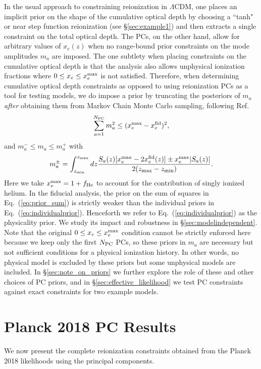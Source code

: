 \documentclass[prd,twocolumn,amsmath,amssymb,floatfix,superscriptaddress,nofootinbib]{revtex4-1}
\begin{document}
In the usual approach to constraining reionization in $\Lambda$CDM, one places an implicit prior on the shape of the cumulative optical depth by choosing a ``tanh" or near step function reionization (see \S \ref{sec:example1}) and then extracts a single constraint on the total optical depth.
The PCs, on the other hand, allow for arbitrary values of $x_e(z)$ when no range-bound prior constraints on the mode amplitudes $m_a$ are imposed. The one subtlety when placing constraints on the cumulative optical depth is that the analysis also allows
unphysical ionization fractions where $0 \le x_e \le x_e^{\rm max}$  is not satisfied.
Therefore, when determining cumulative optical depth constraints as opposed to using reionization PCs as a tool for testing models,
 we do impose a  prior
 by truncating the posteriors of $m_a$
 {\it after} obtaining them from Markov Chain Monte Carlo sampling, following Ref.~\cite{Mortonson:2008rx}
%
\begin{equation}
\sum_{a=1}^{N_{\rm PC}} m_a^2 \le (x_e^{\rm max}-x_e^{\rm fid})^2,
\label{eq:prior_sum}
\end{equation}
and 
$m_a^{-} \le m_a \le m_a^{+}$ with
\begin{equation}
m_a^{\pm} = \int_{z_{\rm min}}^{z_{\rm max} } dz \frac{S_a(z)[x_e^{\rm max} -2 x_e^{\rm fid}(z)]
\pm x_e^{\rm max} | S_a(z)|}{2(z_{\rm max}-z_{\rm min})}.
\label{eq:individualprior}
\end{equation}
Here we take $x_e^{\rm max} = 1+ f_{\rm He} $ to account for the contribution of singly ionized helium.
In the fiducial analysis, the prior on the sum of squares in Eq.~(\ref{eq:prior_sum}) is strictly weaker than the individual priors in Eq.~(\ref{eq:individualprior}).
Henceforth we refer to Eq.~(\ref{eq:individualprior}) as the physicality prior.  We study its impact and robustness in \S \ref{sec:modelindependent}.
%
Note that the original $0\le x_e \le x_e^{\rm max}$ condition cannot be strictly enforced here because we  keep only the first $N_{\rm PC}$ PCs, so these priors in $m_a$ are necessary but not sufficient conditions for a physical ionization history.  
In other words, no physical model is excluded by these priors but some unphysical models are included.  In \S \ref{sec:note_on_priors} we further explore the role of these and other choices of PC priors, and in \S\ref{sec:effective_likelihood} we test PC constraints against exact constraints for two example models.  



\section{Planck 2018 PC Results}
\label{sec:results}
We now present the complete reionization constraints obtained from the Planck 2018 likelihoods using the principal components.
\end{document}
